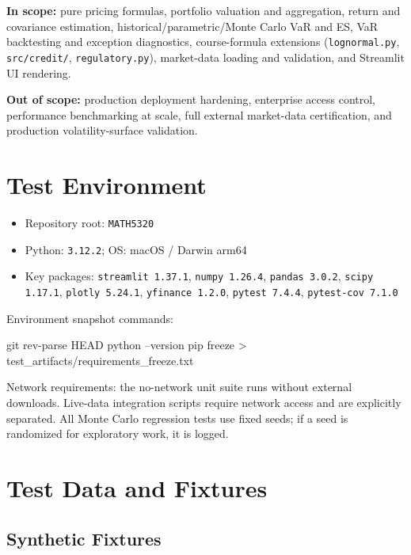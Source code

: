 \documentclass[11pt]{article}
\newcommand{\code}[1]{\texttt{#1}}
\begin{document}
\textbf{In scope:}
pure pricing formulas, portfolio valuation and aggregation, return and
covariance estimation, historical/parametric/Monte Carlo VaR and ES,
VaR backtesting and exception diagnostics, course-formula extensions
(\code{lognormal.py}, \code{src/credit/}, \code{regulatory.py}),
market-data loading and validation, and Streamlit UI rendering.

\textbf{Out of scope:}
production deployment hardening, enterprise access control, performance
benchmarking at scale, full external market-data certification, and
production volatility-surface validation.

\section{Test Environment}

\begin{itemize}
  \item Repository root: \code{MATH5320}
  \item Python: \code{3.12.2}; OS: macOS / Darwin arm64
  \item Key packages: \code{streamlit 1.37.1}, \code{numpy 1.26.4},
    \code{pandas 3.0.2}, \code{scipy 1.17.1}, \code{plotly 5.24.1},
    \code{yfinance 1.2.0}, \code{pytest 7.4.4}, \code{pytest-cov 7.1.0}
\end{itemize}

Environment snapshot commands:
\begin{shellcode}
git rev-parse HEAD
python --version
pip freeze > test_artifacts/requirements_freeze.txt
\end{shellcode}

Network requirements: the no-network unit suite runs without external
downloads.  Live-data integration scripts require network access and are
explicitly separated.  All Monte Carlo regression tests use fixed seeds;
if a seed is randomized for exploratory work, it is logged.

\section{Test Data and Fixtures}

\subsection{Synthetic Fixtures}
\end{document}
